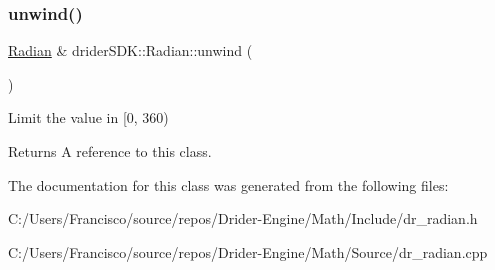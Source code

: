 \subsubsection{\texorpdfstring{unwind()}{unwind()}}
{\footnotesize\ttfamily \hyperlink{classdrider_s_d_k_1_1_radian}{Radian} \& drider\+S\+D\+K\+::\+Radian\+::unwind (\begin{DoxyParamCaption}{ }\end{DoxyParamCaption})}

Limit the value in \mbox{[}0, 360)

\begin{DoxyReturn}{Returns}
A reference to this class. 
\end{DoxyReturn}


The documentation for this class was generated from the following files\+:\begin{DoxyCompactItemize}
\item 
C\+:/\+Users/\+Francisco/source/repos/\+Drider-\/\+Engine/\+Math/\+Include/dr\+\_\+radian.\+h\item 
C\+:/\+Users/\+Francisco/source/repos/\+Drider-\/\+Engine/\+Math/\+Source/dr\+\_\+radian.\+cpp\end{DoxyCompactItemize}
